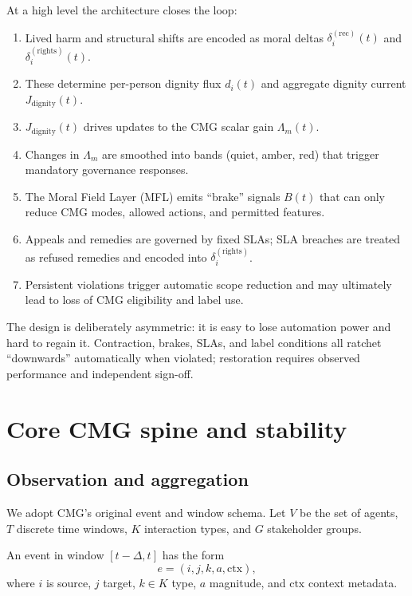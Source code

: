 \documentclass[11pt]{article}
\begin{document}
At a high level the architecture closes the loop:

\begin{enumerate}[leftmargin=*]
  \item Lived harm and structural shifts are encoded as moral deltas \(\delta_i^{(\text{rec})}(t)\) and \(\delta_i^{(\text{rights})}(t)\).
  \item These determine per-person dignity flux \(d_i(t)\) and aggregate dignity current \(J_{\text{dignity}}(t)\).
  \item \(J_{\text{dignity}}(t)\) drives updates to the CMG scalar gain \(\Lambda_m(t)\).
  \item Changes in \(\Lambda_m\) are smoothed into bands (quiet, amber, red) that trigger mandatory governance responses.
  \item The Moral Field Layer (MFL) emits ``brake'' signals \(B(t)\) that can only reduce CMG modes, allowed actions, and permitted features.
  \item Appeals and remedies are governed by fixed SLAs; SLA breaches are treated as refused remedies and encoded into \(\delta_i^{(\text{rights})}\).
  \item Persistent violations trigger automatic scope reduction and may ultimately lead to loss of CMG eligibility and label use.
\end{enumerate}

The design is deliberately asymmetric: it is easy to lose automation power and hard to regain it.
Contraction, brakes, SLAs, and label conditions all ratchet ``downwards'' automatically when violated; restoration requires observed performance and independent sign-off.

\section{Core CMG spine and stability}


\subsection{Observation and aggregation}

We adopt CMG's original event and window schema.
Let \(V\) be the set of agents, \(T\) discrete time windows, \(K\) interaction types, and \(G\) stakeholder groups.\cite{cmg-spec}

An event in window \([t-\Delta, t]\) has the form
\[
e = (i,j,k,a,\text{ctx}),
\]
where \(i\) is source, \(j\) target, \(k \in K\) type, \(a\) magnitude, and \(\text{ctx}\) context metadata.
\end{document}
